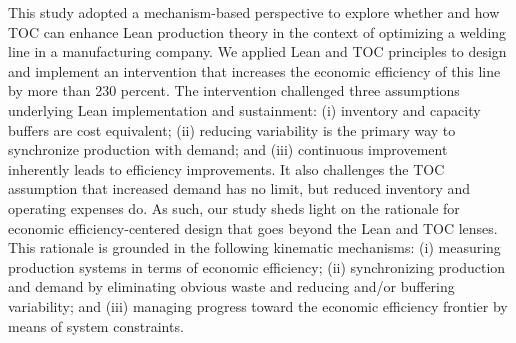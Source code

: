 This study adopted a mechanism-based perspective to explore whether and
how TOC can enhance Lean production theory in the context of optimizing
a welding line in a manufacturing company. We applied Lean and TOC
principles to design and implement an intervention that increases the
economic efficiency of this line by more than 230 percent. The
intervention challenged three assumptions underlying Lean implementation
and sustainment: (i) inventory and capacity buffers are cost equivalent;
(ii) reducing variability is the primary way to synchronize production
with demand; and (iii) continuous improvement inherently leads to
efficiency improvements. It also challenges the TOC assumption that
increased demand has no limit, but reduced inventory and operating
expenses do. As such, our study sheds light on the rationale for
economic efficiency-centered design that goes beyond the Lean and TOC
lenses. This rationale is grounded in the following kinematic
mechanisms: (i) measuring production systems in terms of economic
efficiency; (ii) synchronizing production and demand by eliminating
obvious waste and reducing and/or buffering variability; and (iii)
managing progress toward the economic efficiency frontier by means of
system constraints.
